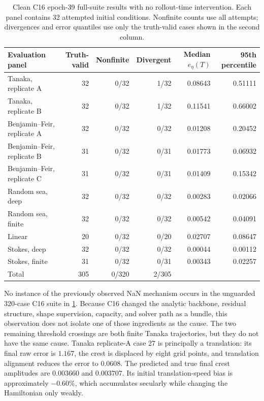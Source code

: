 \begin{table}[t]
  \centering
  \small
  \caption{Clean C16 epoch-39 full-suite results with no rollout-time
  intervention.  Each panel contains 32 attempted initial conditions.
  Nonfinite counts use all attempts; divergences and error quantiles use only
  the truth-valid cases shown in the second column.}
  \label{tab:c16-results}
  \begin{tabular}{lrrrrr}
    \toprule
    Evaluation panel & Truth-valid & Nonfinite & Divergent
      & Median $e_\eta(T)$ & 95th percentile\\
    \midrule
    Tanaka, replicate A          & 32 & 0/32 & 1/32 & 0.08643 & 0.51111\\
    Tanaka, replicate B          & 32 & 0/32 & 1/32 & 0.11541 & 0.66002\\
    Benjamin--Feir, replicate A  & 32 & 0/32 & 0/32 & 0.01208 & 0.20452\\
    Benjamin--Feir, replicate B  & 31 & 0/32 & 0/31 & 0.01773 & 0.06932\\
    Benjamin--Feir, replicate C  & 31 & 0/32 & 0/31 & 0.01409 & 0.15342\\
    Random sea, deep   & 32 & 0/32 & 0/32 & 0.00283 & 0.02066\\
    Random sea, finite & 32 & 0/32 & 0/32 & 0.00542 & 0.04091\\
    Linear             & 20 & 0/32 & 0/20 & 0.02707 & 0.08647\\
    Stokes, deep       & 32 & 0/32 & 0/32 & 0.00044 & 0.00112\\
    Stokes, finite     & 31 & 0/32 & 0/31 & 0.00343 & 0.02257\\
    \midrule
    Total              & 305 & 0/320 & 2/305 & & \\
    \bottomrule
  \end{tabular}
\end{table}

No instance of the previously observed NaN mechanism occurs in the unguarded
320-case C16 suite in \cref{tab:c16-results}. Because C16 changed the analytic
backbone, residual structure, shape supervision, capacity, and solver path as a
bundle, this observation does not isolate one of those ingredients as the
cause. The two remaining threshold
crossings are both finite Tanaka trajectories, but they do not have the same
cause. Tanaka replicate-A case 27 is principally a translation: its final raw error is
$1.167$, the crest is displaced by eight grid points, and translation
alignment reduces the error to $0.0608$. The predicted and true final crest
amplitudes are $0.003660$ and $0.003707$. Its initial translation-speed bias is
approximately $-0.60\%$, which accumulates secularly while changing the
Hamiltonian only weakly.

